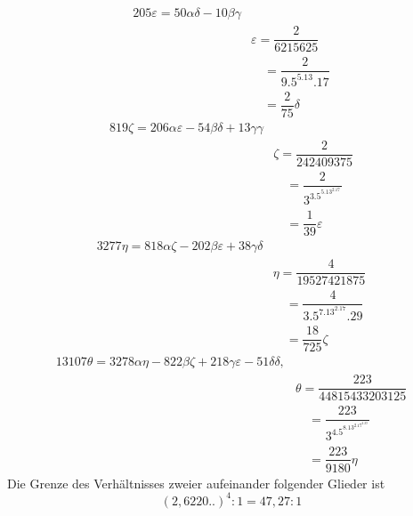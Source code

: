 \[
\begin{aligned}205\varepsilon=50\alpha\delta-10\beta\gamma\\[5pt]&\varepsilon=\dfrac2{6215625}\\[5pt]&\quad=\dfrac2{9.5^5.13.17}\\[5pt]&\quad=\dfrac2{75}\delta\end{aligned}
\]
\[
\begin{aligned}819\zeta=206\alpha\varepsilon-54\beta\delta+13\gamma\gamma\\[5pt]&\zeta=\dfrac2{242409375}\\[5pt]&\quad=\dfrac2{3^3.5^5.13^2.17}\\[5pt]&\quad=\dfrac1{39}\varepsilon\end{aligned}
\]
\[
\begin{aligned}3277\eta=818\alpha\zeta-202\beta\varepsilon+38\gamma\delta\\[5pt]&\eta=\dfrac4{19527421875}\\[5pt]&\quad=\dfrac4{3.5^7.13^2.17.29}\\[5pt]&\quad=\dfrac{18}{725}\zeta\end{aligned}
\]
\[
\begin{aligned}13107\theta=3278\alpha\eta-822\beta\zeta+218\gamma\varepsilon-51\delta\delta,\\[5pt]&\theta=\dfrac{223}{44815433203125}\\[5pt]&\quad=\dfrac{223}{3^4.5^8.13^2.17^2.29}\\[5pt]&\quad=\dfrac{223}{9180}\eta\end{aligned}
\]
Die Grenze des Verhältnisses zweier aufeinander folgender Glieder ist
\[
(2{,}6220\mathord{.}\mathord{.})^4:1=47{,}27:1
\]


